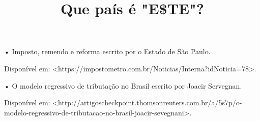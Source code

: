 \documentclass[12pt,a4paper]{article}
\title{Que país é "E\$TE"?}
\begin{document}
\onehalfspacing

\noindent
• Imposto, remendo e reforma escrito por o Estado de São Paulo.

Disponível em: <https://impostometro.com.br/Noticias/Interna?idNoticia=78>.

• O modelo regressivo de tributação no Brasil escrito por Joacir Servegnan.

Disponível em: <http://artigoscheckpoint.thomsonreuters.com.br/a/5s7p/o-modelo-regressivo-de-tributacao-no-brasil-joacir-sevegnani>.\\
\newline

\maketitle
\end{document}
